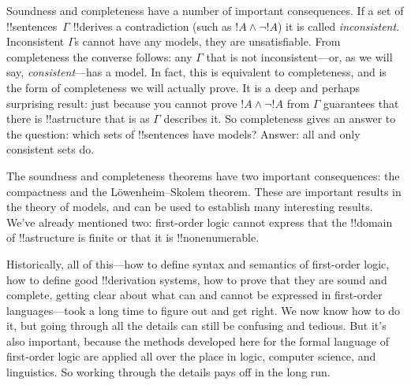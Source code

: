 Soundness and completeness have a number of important consequences. If
a set of !!{sentence}s~$\Gamma$ !!{derive}s a contradiction (such as
$!A \land \lnot !A$) it is called \emph{inconsistent}. Inconsistent
$\Gamma$s cannot have any models, they are unsatisfiable. From
completeness the converse follows: any $\Gamma$ that is not
inconsistent---or, as we will say, \emph{consistent}---has a model. In
fact, this is equivalent to completeness, and is the form of
completeness we will actually prove.  It is a deep and perhaps
surprising result: just because you cannot prove $!A \land \lnot !A$
from $\Gamma$ guarantees that there is !!a{structure} that is as
$\Gamma$ describes it.  So completeness gives an answer to the
question: which sets of !!{sentence}s have models? Answer: all and only
consistent sets do.

The soundness and completeness theorems have two important
consequences: the compactness and the L\"owenheim--Skolem theorem.
These are important results in the theory of models, and can be used
to establish many interesting results. We've already mentioned two:
first-order logic cannot express that the !!{domain} of !!a{structure}
is finite or that it is !!{nonenumerable}.

Historically, all of this---how to define syntax and semantics of
first-order logic, how to define good !!{derivation} systems, how to prove that
they are sound and complete, getting clear about what can and cannot
be expressed in first-order languages---took a long time to figure out
and get right.  We now know how to do it, but going through all the
details can still be confusing and tedious.  But it's also important,
because the methods developed here for the formal language of
first-order logic are applied all over the place in logic, computer
science, and linguistics. So working through the details pays off in
the long run.



\OLEndChapterHook





